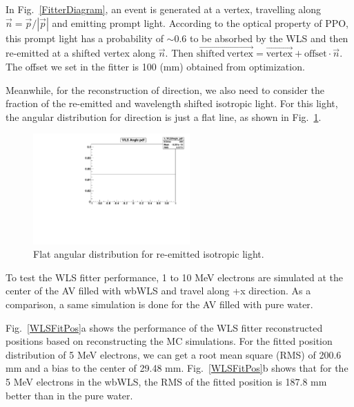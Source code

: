 \documentclass[preprint,12pt]{elsarticle}
\numberwithin{equation}{section}
\begin{document}
In Fig.~\ref{FitterDiagram}, an event is generated at a vertex, travelling along $\vec n = \vec{p}/|\vec{p}|$ and emitting prompt light. According to the optical property of PPO, this prompt light has a probability of $\sim$0.6 to be absorbed by the WLS and then re-emitted at a shifted vertex along $\vec n$. Then $\overrightarrow{\mathrm{shifted~vertex}}=\overrightarrow{\mathrm{vertex}}+\mathrm{offset}\cdot\vec{n}$.  
The offset we set in the fitter is 100 (mm) obtained from optimization. 

Meanwhile, for the reconstruction of direction, we also need to consider the fraction of the re-emitted and wavelength shifted isotropic light. For this light, the angular distribution for direction is just a flat line, as shown in Fig.~\ref{WLSAngle}.

\begin{figure}[htbp]
	\centering
	\includegraphics[width=6cm]{WLSAngle_pdf.pdf}
	\caption{Flat angular distribution for re-emitted isotropic light.}
	\label{WLSAngle} 
\end{figure}

To test the WLS fitter performance, 1 to 10 MeV electrons are simulated at the center of the AV filled with wbWLS and travel along +x direction. As a comparison, a same simulation is done for the AV filled with pure water.

Fig.~\ref{WLSFitPos}a shows the performance of the WLS fitter reconstructed positions based on reconstructing the MC simulations. For the fitted position distribution of 5 MeV electrons, we can get a root mean square (RMS) of 200.6 mm and a bias to the center of 29.48 mm. Fig.~\ref{WLSFitPos}b shows that for the 5 MeV electrons in the wbWLS, the RMS of the fitted position is 187.8 mm better than in the pure water.
\end{document}
